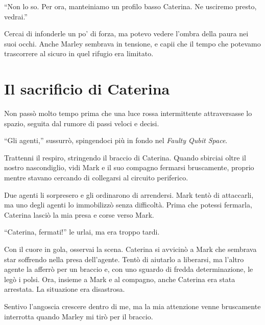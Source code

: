 \begin{dialogue}
 \enquote{Non lo so. Per ora, manteiniamo un profilo basso Caterina. Ne usciremo presto, vedrai.}
\end{dialogue}

Cercai di infonderle un po’ di forza, ma potevo vedere l’ombra della paura nei suoi occhi. Anche Marley sembrava in tensione, e capii che il  tempo che potevamo trascorrere al sicuro in quel rifugio era limitato.

\section{Il sacrificio di Caterina}
Non passò molto tempo prima che una luce rossa intermittente attraversasse lo spazio, seguita dal rumore di passi veloci e decisi. 

\begin{dialogue}
 \enquote{Gli agenti,} sussurrò, spingendoci più in fondo nel \textit{Faulty Qubit Space}.
\end{dialogue}

Trattenni il respiro, stringendo il braccio di Caterina. Quando sbirciai oltre il nostro nascondiglio, vidi Mark e il suo compagno fermarsi bruscamente, proprio mentre stavano cercando di collegarsi al circuito periferico.

Due agenti li sorpresero e gli ordinarono di arrendersi. Mark tentò di attaccarli, ma uno degli agenti lo immobilizzò senza difficoltà. Prima che potessi fermarla, Caterina lasciò la mia presa e corse verso Mark.

\begin{dialogue}
 \enquote{Caterina, fermati!} le urlai, ma era troppo tardi.
\end{dialogue}

Con il cuore in gola, osservai la scena. Caterina si avvicinò a Mark che sembrava star soffrendo nella presa dell'agente. Tentò di aiutarlo a liberarsi, ma l'altro agente la afferrò per un braccio e, con uno sguardo di fredda determinazione, le legò i polsi. Ora, insieme a Mark e al compagno, anche Caterina era stata arrestata. La situazione era disastrosa.

Sentivo l'angoscia crescere dentro di me, ma la mia attenzione venne bruscamente interrotta quando Marley mi tirò per il braccio.


